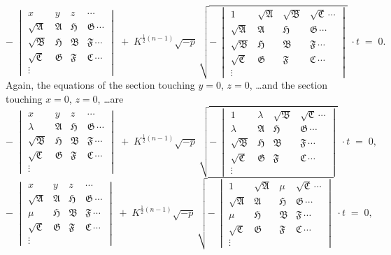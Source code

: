 \documentclass[11pt]{article}
\providecommand{\fA}{\mathfrak{A}}
\providecommand{\fB}{\mathfrak{B}}
\providecommand{\fC}{\mathfrak{C}}
\providecommand{\fF}{\mathfrak{F}}
\providecommand{\fG}{\mathfrak{G}}
\providecommand{\fH}{\mathfrak{H}}
\begin{document}
\[
-\;\begin{vmatrix} x & y & z & \cdots \\ \sqrt{\fA} & \fA & \fH & \fG\,\cdots \\ \sqrt{\fB} & \fH & \fB & \fF\,\cdots \\ \sqrt{\fC} & \fG & \fF & \fC\,\cdots \\ \vdots \end{vmatrix}
\;+\; K^{\frac{1}{2}(n-1)}\sqrt{-p}\,\sqrt{-\,\begin{vmatrix} 1 & \sqrt{\fA} & \sqrt{\fB} & \sqrt{\fC}\,\cdots \\ \sqrt{\fA} & \fA & \fH & \fG\,\cdots \\ \sqrt{\fB} & \fH & \fB & \fF\,\cdots \\ \sqrt{\fC} & \fG & \fF & \fC\,\cdots \\ \vdots \end{vmatrix}}\;\cdot t \;=\; 0.
\]
Again, the equations of the section touching $y = 0$, $z = 0$, \ldots and the section touching $x = 0$, $z = 0$, \ldots are
\[
-\;\begin{vmatrix} x & y & z & \cdots \\ \lambda & \fA & \fH & \fG\,\cdots \\ \sqrt{\fB} & \fH & \fB & \fF\,\cdots \\ \sqrt{\fC} & \fG & \fF & \fC\,\cdots \\ \vdots \end{vmatrix}
\;+\; K^{\frac{1}{2}(n-1)}\sqrt{-p}\,\sqrt{-\,\begin{vmatrix} 1 & \lambda & \sqrt{\fB} & \sqrt{\fC}\,\cdots \\ \lambda & \fA & \fH & \fG\,\cdots \\ \sqrt{\fB} & \fH & \fB & \fF\,\cdots \\ \sqrt{\fC} & \fG & \fF & \fC\,\cdots \\ \vdots \end{vmatrix}}\;\cdot t \;=\; 0,
\]
\[
-\;\begin{vmatrix} x & y & z & \cdots \\ \sqrt{\fA} & \fA & \fH & \fG\,\cdots \\ \mu & \fH & \fB & \fF\,\cdots \\ \sqrt{\fC} & \fG & \fF & \fC\,\cdots \\ \vdots \end{vmatrix}
\;+\; K^{\frac{1}{2}(n-1)}\sqrt{-p}\,\sqrt{-\,\begin{vmatrix} 1 & \sqrt{\fA} & \mu & \sqrt{\fC}\,\cdots \\ \sqrt{\fA} & \fA & \fH & \fG\,\cdots \\ \mu & \fH & \fB & \fF\,\cdots \\ \sqrt{\fC} & \fG & \fF & \fC\,\cdots \\ \vdots \end{vmatrix}}\;\cdot t \;=\; 0,
\]
\end{document}
